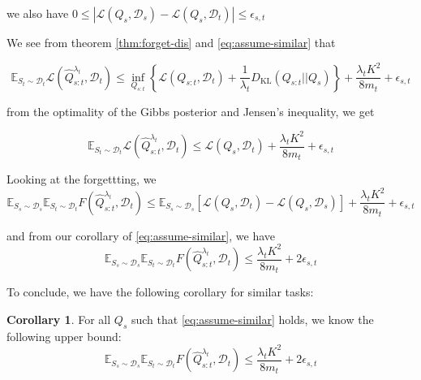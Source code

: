 \documentclass[letterpaper]{article}
\theoremstyle{definition}
\newtheorem{corollary}{Corollary}
\begin{document}
we also have $0\leq |\mathcal{L}(Q_s,\mathcal{D}_s)-\mathcal{L}(Q_s,\mathcal{D}_t)|
\leq \epsilon_{s,t}$

We see from theorem \ref{thm:forget-dis} and \eqref{eq:assume-similar} that 

\begin{equation*}
\mathbb{E}_{S_t\sim \mathcal{D}_t}\mathcal{L}(\hat{Q}^{\lambda_t}_{s:t},\mathcal{D}_t)\leq \inf_{Q_{s:t}}\left \{ \mathcal{L}(Q_{s:t},\mathcal{D}_t) + \frac{1}{\lambda_t}D_{\mathrm{KL}}(Q_{s:t}||Q_{s}) \right \}+\frac{\lambda_t K^2}{8m_t} + \epsilon_{s,t}
\end{equation*}

from the optimality of the Gibbs posterior and Jensen's inequality, we get 

\begin{equation*}
\mathbb{E}_{S_t\sim \mathcal{D}_t}\mathcal{L}(\hat{Q}^{\lambda_t}_{s:t},\mathcal{D}_t)\leq \mathcal{L}(Q_{s},\mathcal{D}_t)+\frac{\lambda_t K^2}{8m_t} + \epsilon_{s,t}
\end{equation*}

Looking at the forgettting, we 
\begin{equation*}
\mathbb{E}_{S_s\sim \mathcal{D}_s}\mathbb{E}_{S_t\sim \mathcal{D}_t}F(\hat{Q}^{\lambda_t}_{s:t},\mathcal{D}_t)\leq \mathbb{E}_{S_s\sim \mathcal{D}_s}\left [\mathcal{L}(Q_{s},\mathcal{D}_t)-\mathcal{L}(Q_{s},\mathcal{D}_s)\right ]+\frac{\lambda_t K^2}{8m_t} + \epsilon_{s,t}
\end{equation*}

and from our corollary of \eqref{eq:assume-similar}, we have
\begin{equation*}
\mathbb{E}_{S_s\sim \mathcal{D}_s}\mathbb{E}_{S_t\sim \mathcal{D}_t}F(\hat{Q}^{\lambda_t}_{s:t},\mathcal{D}_t)\leq \frac{\lambda_t K^2}{8m_t} + 2\epsilon_{s,t}
\end{equation*}

To conclude, we have the following corollary for similar tasks:

\begin{corollary}
    For all $Q_s$ such that \eqref{eq:assume-similar} holds,
    we know the following upper bound:
    \begin{equation}
\mathbb{E}_{S_s\sim \mathcal{D}_s}\mathbb{E}_{S_t\sim \mathcal{D}_t}F(\hat{Q}^{\lambda_t}_{s:t},\mathcal{D}_t)\leq \frac{\lambda_t K^2}{8m_t} + 2\epsilon_{s,t}
    \end{equation}
\end{corollary}

\iffalse
\end{document}
